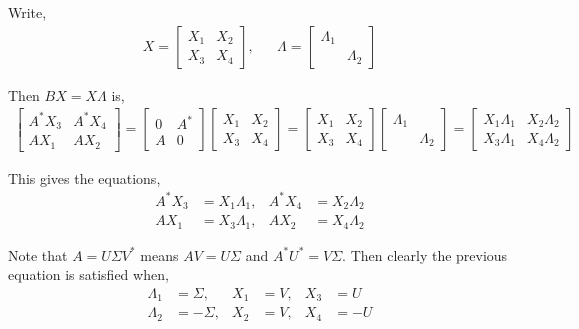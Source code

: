 \documentclass[10pt]{article}
\begin{document}
\begin{solution}[Solution]
Write,
\begin{align*}
    X = \left[\begin{array}{cc}X_1 & X_2 \\ X_3 & X_4\end{array}\right], && \Lambda = \left[\begin{array}{cc}\Lambda_1 \\ & \Lambda_2 \end{array}\right]
\end{align*}

Then \( BX = X\Lambda  \) is,
\begin{align*}
    \left[\begin{array}{cc}A^*X_3 & A^*X_4 \\ AX_1 & AX_2 \end{array}\right]
    =\left[\begin{array}{cc}0 & A^* \\ A & 0 \end{array}\right] \left[\begin{array}{cc}X_1 & X_2 \\ X_3 & X_4\end{array}\right]
    = \left[\begin{array}{cc}X_1 & X_2 \\ X_3 & X_4\end{array}\right] \left[\begin{array}{cc}\Lambda_1 \\ & \Lambda_2 \end{array}\right]
    = \left[\begin{array}{cc}X_1\Lambda_1 & X_2\Lambda_2 \\ X_3\Lambda_1 & X_4 \Lambda_2\end{array}\right]
\end{align*}

This gives the equations,
\begin{align*}
    A^*X_3 &= X_1\Lambda_1, & A^*X_4 &= X_2\Lambda_2 \\
    AX_1 &= X_3\Lambda_1, &  AX_2 &= X_4\Lambda_2
\end{align*}

Note that \( A = U\Sigma V^* \) means \( AV = U\Sigma \) and \( A^*U^* =  V\Sigma \). Then clearly the previous equation is satisfied when,
\begin{align*}
    \Lambda_1  &= \Sigma, & X_1 &= V, & X_3 &= U \\
    \Lambda_2  &= -\Sigma, & X_2 &= V, & X_4 &= -U
\end{align*}


\end{solution}
\end{document}
